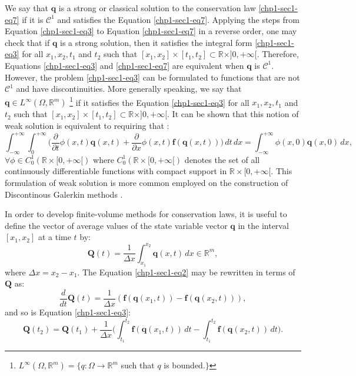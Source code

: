 We say that $\mathbf{q}$ is a strong or classical solution to the conservation law \eqref{chp1-sec1-eq7}
if it is $\mathcal{C}^1$ and satisfies the Equation \eqref{chp1-sec1-eq7}.
Applying the steps from Equation \eqref{chp1-sec1-eq3} to Equation \eqref{chp1-sec1-eq7}
in a reverse order, one may check that if $\mathbf{q}$ is a strong solution,
then it satisfies the integral form \eqref{chp1-sec1-eq3} for all $x_1, x_2, t_1$ and $t_2$ such that
$[x_1, x_2] \times [t_1, t_2] \subset \mathbb{R}\times ]0, +\infty[$. 
Therefore, Equations \eqref{chp1-sec1-eq3} and \eqref{chp1-sec1-eq7} are
equivalent when $\mathbf{q}$ is $\mathcal{C}^1$.
However, the problem \eqref{chp1-sec1-eq3} can be formulated
to functions that are not $\mathcal{C}^1$ and have discontinuities.
More generally speaking, we say that $\mathbf{q} \in L^{\infty}(\Omega, \mathbb{R}^m)$ 
\footnote{$L^{\infty}(\Omega, \mathbb{R}^m) = \{q: \Omega \to \mathbb{R}^m$
such that $q$ is bounded.$\}$}
if it satisfies the Equation 
\eqref{chp1-sec1-eq3} for all $x_1, x_2, t_1$ and $t_2$ such that
$[x_1, x_2] \times [t_1, t_2] \subset \mathbb{R}\times ]0, +\infty[$.
It can be shown that this notion of weak solution is equivalent to requiring that \citep{leveque:1990}:
\begin{equation}
	\label{chp1-sec1-eq8}
	\int_{-\infty}^{+\infty} \int_{0}^{+\infty} \bigg(
	\frac{\partial}{\partial t} \phi(x, t)\mathbf{q}(x, t) +
	\frac{\partial}{\partial x} \phi(x ,t)\mathbf{f}(\mathbf{q}(x, t)) 
	\bigg)\,dt \,dx = 
	\int_{-\infty}^{+\infty} \phi(x, 0)\mathbf{q}(x, 0) \,dx  , \quad
\end{equation}
$\forall \phi \in C_{0}^{1}(\mathbb{R}\times[0, +\infty[)$
where $C_{0}^{1}(\mathbb{R}\times[0, +\infty[)$ denotes the set
of all continuously differentiable functions with compact support 
in $\mathbb{R}\times[0, +\infty[$. This formulation of weak solution
is more common employed on the construction of Discontinous Galerkin
methods \citep{nair:2011}.

In order to develop finite-volume methods for conservation laws, it is useful to define the vector of
average values of the state variable vector $\mathbf{q}$ in the interval $[x_1, x_2]$ at a time $t$ by:
\begin{equation}
	\label{chp1-sec1-eq9}
	\mathbf{Q}(t) = \frac{1}{\Delta x}
	\int_{x_1}^{x_2} \mathbf{q}(x,t) \,dx
	\in \mathbb{R}^m,
\end{equation}
where $\Delta x = x_2 - x_1$. The Equation \eqref{chp1-sec1-eq2} may be  rewritten in terms of $\mathbf{Q}$ as:
\begin{equation}
        \label{chp1-sec1-eq10}
	\frac{d}{dt} \mathbf{Q}(t) = \frac{1}{\Delta x} 
	(\mathbf{f}(\mathbf{q}(x_1,t)) - \mathbf{f}(\mathbf{q}(x_2,t))) ,
\end{equation}
and so is Equation \eqref{chp1-sec1-eq3}:
\begin{equation}
        \label{chp1-sec1-eq11}
	\mathbf{Q}(t_2) =  \mathbf{Q}(t_1) + 
	\frac{1}{\Delta x}\bigg( \int_{t_1}^{t_2} 
	\mathbf{f}(\mathbf{q}(x_1, t)) \,dt - 
	\int_{t_1}^{t_2}\mathbf{f}(\mathbf{q}(x_2, t)) \,dt \bigg).
\end{equation}

